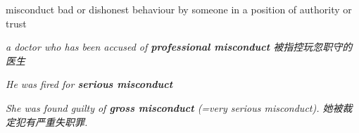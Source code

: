 \begin{DefWord}{misconduct}
    bad or dishonest behaviour by someone in a position of authority or trust

    \textit{a doctor who has been accused of \textbf{professional misconduct} 被指控玩忽职守的医生}

    \textit{He was fired for \textbf{serious misconduct}}

    \textit{She was found guilty of \textbf{gross misconduct} (=very serious misconduct). 她被裁定犯有严重失职罪. }
\end{DefWord}